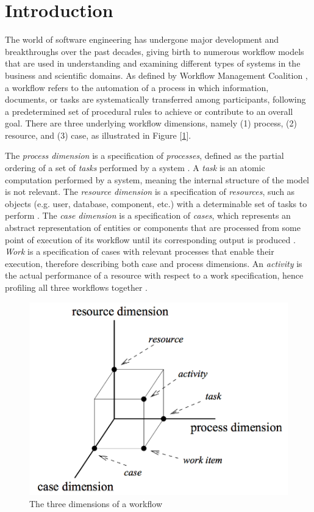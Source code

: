 \section{Introduction}
The world of software engineering has undergone major development and breakthroughs over the past decades, giving birth to numerous workflow models that are used in understanding and examining different types of systems in the business and scientific domains. As defined by Workflow Management Coalition \cite{workflow}, a workflow refers to the automation of a process in which information, documents, or tasks are systematically transferred among participants, following a predetermined set of procedural rules to achieve or contribute to an overall goal. There are three underlying workflow dimensions, namely (1) process, (2) resource, and (3) case, as illustrated in Figure [\ref{workflow_dimensions}]. \par

The \textit{process dimension} is a specification of \textit{processes}, defined as the partial ordering of a set of \textit{tasks} performed by a system \cite{malinao-rdlt}. A \textit{task} is an atomic computation performed by a system, meaning the internal structure of the model is not relevant. The \textit{resource dimension} is a specification of \textit{resources}, such as objects (e.g. user, database, component, etc.) with a determinable set of tasks to perform \cite{malinao-rdlt}. The \textit{case dimension} is a specification of \textit{cases}, which represents an abstract representation of entities or components that are processed from some point of execution of its workflow until its corresponding output is produced \cite{malinao-rdlt}. \textit{Work} is a specification of cases with relevant processes that enable their execution, therefore describing both case and process dimensions. An \textit{activity} is the actual performance of a resource with respect to a work specification, hence profiling all three workflows together \cite{malinao-rdlt}.

\begin{figure}[h]
    \centering
    \includegraphics{figures/workflow-dimensions.png}
    \caption{The three dimensions of a workflow \cite{vanderaalst}}
    \label{workflow_dimensions}
\end{figure} \par

